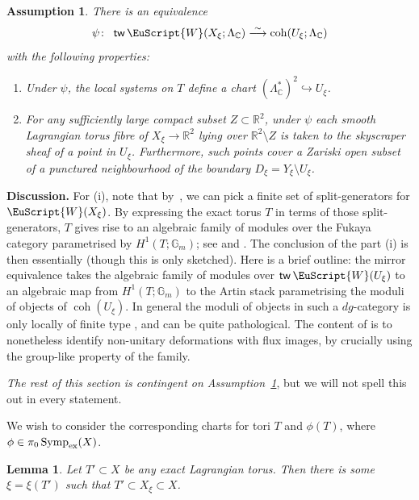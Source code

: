 \documentclass[pdftex]{sigma}
\newcommand {\ccoh} {\operatorname{coh}}
\def\scrW{\EuScript{W}}
\DeclareMathOperator{\Symp}{Symp}
\def\bG{\mathbb{G}}
\def\bC{\mathbb{C}}
\def\bR{\mathbb{R}}
\newtheorem{lem}[thm]{Lemma}
\newtheorem{assum}[thm]{Assumption}
\theoremstyle{definition}
\DeclareMathOperator{\tw}{\mathsf{tw}}
\numberwithin{equation}{section}
\begin{document}
\begin{assum}\label{assump:inexact} There is an equivalence
 \[
 \psi\colon \ \tw \scrW(X_{\xi};\Lambda_{\bC
}) \stackrel{\sim}{\longrightarrow} \mathrm{coh} (U_{\xi};\Lambda_\bC)
 \]
 with the following properties:
\begin{enumerate}\itemsep=0pt
 \item[$(i)$] Under $\psi$, the local systems on $T$ define a chart $(\Lambda_{\bC}^*)^2 \hookrightarrow U_\xi$.
 \item[$(ii)$] For any sufficiently large compact subset $Z \subset \bR^2$, under $\psi$ each smooth Lagrangian torus fibre of $X_{\xi} \to \bR^2$ lying over $\bR^2 \setminus Z$ is taken to the skyscraper sheaf of a point in $U_{\xi}$. Furthermore, such points cover a Zariski open subset of a punctured neighbourhood of the boundary $D_{\xi} = Y_{\xi} \setminus U_{\xi}$.
\end{enumerate}
\end{assum}

{\bf Discussion.}
For (i), note that by~\cite{GPS}, we can pick a finite set of split-generators for $\scrW(X_{\xi})$.
By expressing the exact torus $T$ in terms of those split-generators, $T$ gives rise to an algebraic family of modules over the Fukaya category parametrised by $H^1(T;\bG_m)$; see \cite{Seidel:Flux} and \cite[Sections~2 and~3]{Kartal:algebraic}. The conclusion of the part (i) is then essentially \cite[Note~1.12]{Kartal:algebraic} (though this is only sketched).
Here is a brief outline: the mirror equivalence takes the algebraic family of modules over $\tw \scrW(U_{\xi})$ to an algebraic map from $H^1(T;\bG_m)$ to the Artin stack parametrising the moduli of objects of $\ccoh(U_\xi)$. In general the moduli of objects in such a $dg$-category is only locally of finite type \cite{TV}, and can be quite pathological. The content of \cite{Kartal:algebraic} is to nonetheless identify non-unitary deformations with flux images, by crucially using the group-like property of the family. %

\emph{The rest of this section is contingent on Assumption~{\rm \ref{assump:inexact}}}, but we will not spell this out in every statement.

 We wish to consider the corresponding charts for tori $T$ and $\phi(T)$, where $\phi \in \pi_0\Symp_{\rm ex}(X)$.

 \begin{lem}
 Let $T' \subset X$ be any exact Lagrangian torus. Then there is some $\xi = \xi(T')$ such that $T' \subset X_{\xi} \subset X$. \end{lem}
\end{document}
